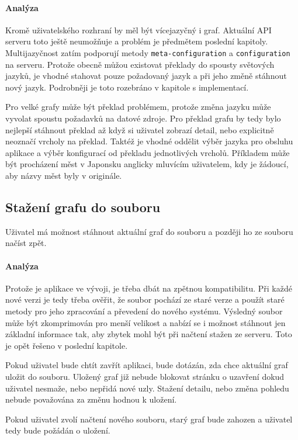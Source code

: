 \paragraph{Analýza} Kromě uživatelského rozhraní by měl být vícejazyčný i graf. Aktuální API serveru toto ještě neumožňuje a problém je předmětem poslední kapitoly. Multijazyčnost zatím podporují metody \texttt{meta-configuration} a \texttt{configuration} na serveru. Protože obecně můžou existovat překlady do spousty světových jazyků, je vhodné stahovat pouze požadovaný jazyk a při jeho změně stáhnout nový jazyk. Podrobněji je toto rozebráno v kapitole s implementací.

Pro velké grafy může být překlad problémem, protože změna jazyku může vyvolat spoustu požadavků na datové zdroje. Pro překlad grafu by tedy bylo nejlepší stáhnout překlad až když si uživatel zobrazí detail, nebo explicitně neoznačí vrcholy na překlad. Taktéž je vhodné oddělit výběr jazyka pro obsluhu aplikace a výběr konfigurací od překladu jednotlivých vrcholů. Příkladem může být procházení měst v Japonsku anglicky mluvícím uživatelem, kdy je žádoucí, aby názvy měst byly v originále.

\subsection{Stažení grafu do souboru}
Uživatel má možnost stáhnout aktuální graf do souboru a později ho ze souboru načíst zpět.

\paragraph{Analýza} Protože je aplikace ve vývoji, je třeba dbát na zpětnou kompatibilitu. Při každé nové verzi je tedy třeba ověřit, že soubor pochází ze staré verze a použít staré metody pro jeho zpracování a převedení do nového systému. Výsledný soubor může být zkomprimován pro menší velikost a nabízí se i možnost stáhnout jen základní informace tak, aby zbytek mohl být při načtení stažen ze serveru. Toto je opět řešeno v poslední kapitole.

Pokud uživatel bude chtít zavřít aplikaci, bude dotázán, zda chce aktuální graf uložit do souboru. Uložený graf již nebude blokovat stránku o uzavření dokud uživatel nesmaže, nebo nepřidá nové uzly. Stažení detailu, nebo změna pohledu nebude považována za změnu hodnou k uložení.

Pokud uživatel zvolí načtení nového souboru, starý graf bude zahozen a uživatel tedy bude požádán o uložení.

